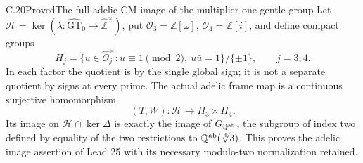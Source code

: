 \begin{statement}{C.20}{Proved}{The full adelic CM image of the multiplier-one gentle group}
Let $\mathcal H=\ker(\lambda:\widehat{\mathrm{GT}}_0
\to\widehat{\mathbb Z}^{\times})$, put
$\mathcal O_3=\mathbb Z[\omega]$, $\mathcal O_4=\mathbb Z[i]$,
and define compact groups
\[
 H_j=\{u\in\widehat{\mathcal O}_j^{\times}:
                u\equiv1\pmod2,\ u\bar u=1\}/\{\pm1\},
                    \qquad j=3,4.
 \tag{C.20.1}
\]
In each factor the quotient is by the single global sign;
it is not a separate quotient by signs at every prime.
The actual adelic frame map is a continuous surjective
homomorphism
\[
           (T,W):\mathcal H\longrightarrow H_3\times H_4.
 \tag{C.20.2}
\]
Its image on $\mathcal H\cap\ker\Delta$ is exactly
the image of $G_{\mathbb Q^{\rm ab}}$, the subgroup of
index two defined by equality of the two restrictions to
$\mathbb Q^{\rm ab}(\sqrt[4]{3})$.
This proves the adelic image assertion of Lead 25 with
its necessary modulo-two normalization retained.
\end{statement}
